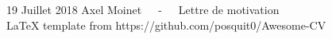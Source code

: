 \documentclass[11pt, a4paper]{awesome-cv}
\begin{document}
\makecvheader[R]

\makecvfooter
  {19 Juillet 2018}
  {Axel Moinet~~~-~~~Lettre de motivation\\ LaTeX template from https://github.com/posquit0/Awesome-CV}
  {}

\makelettertitle

\begin{cvletter}


\end{cvletter}
\end{document}
